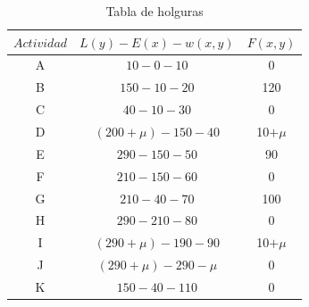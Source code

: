 \documentclass[letterpaper,10pt]{article}
\begin{document}
\begin{enumerate}
        \begin{table}[H]
            \centering
        \begin{tabular}{|c|c|c|}\hline
            $ Actividad  $ & $L(y) - E(x) - w(x, y)$ & $F(x, y)$  \\ \hline
             A & $10 - 0 - 10$ & 0      \\\hline
             B & $150 - 10 - 20$ & 120   \\\hline
             C & $40 - 10 - 30$ & 0      \\\hline
             D & $(200 + \mu) - 150 - 40$ & 10$+\mu$   \\\hline
             E & $290-150-50$ & 90      \\\hline
             F & $210-150-60$ & 0   \\\hline
             G & $210-40-70$ & 100      \\\hline
             H & $290-210-80$ & 0   \\\hline
             I & $(290+\mu)-190-90$ & 10$+\mu$     \\\hline
             J & $(290+\mu)-290-\mu$ & 0   \\\hline
             K & $150-40-110$ & 0      \\\hline
            \end{tabular}
            \caption{Tabla de holguras}
            \label{tablitaholgura}
        \end{table}


\end{enumerate}
\end{document}
